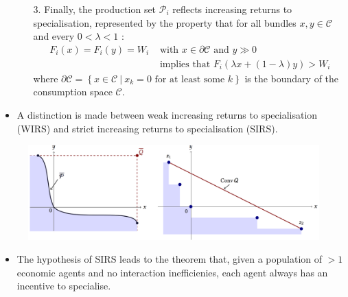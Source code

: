 \documentclass[10pt]{beamer}
\begin{document}
\begin{frame}
\begin{itemize}
\item[]
\begin{itemize}
\item[3.] Finally, the production set $\mathcal{P}_{i}$ reflects increasing returns to specialisation, represented by the property that for all bundles $x,y \in \mathcal{C}$ and every $0 < \lambda < 1$ :
\begin{align*}
F_{i}(x) = F_{i}(y) = W_{i} &\mbox{ with } x \in \partial \mathcal{C} \mbox{ and } y \gg 0 \\
&\mbox{ implies that } F_{i}( \lambda x + (1 - \lambda) y) > W_{i}
\end{align*}
where $\partial \mathcal{C} = \left\{ x \in \mathcal{C} ~ | ~ x_{k} = 0 \mbox{ for at least some } k \right\}$ is the boundary of the consumption space $\mathcal{C}$.
\end{itemize}
\end{itemize}
\end{frame}

\begin{frame}
\begin{itemize}
\item A distinction is made between weak increasing returns to specialisation (WIRS) and strict increasing returns to specialisation (SIRS).
\end{itemize}
\begin{figure}[h]
\centering
\includegraphics[scale=0.135]{../Images/IRS.png}
\end{figure}
\begin{itemize}
\item The hypothesis of SIRS leads to the theorem that, given a population of $> 1$ economic agents and no interaction inefficienies, each agent always has an incentive to specialise.
\end{itemize}
\end{frame}
\end{document}
